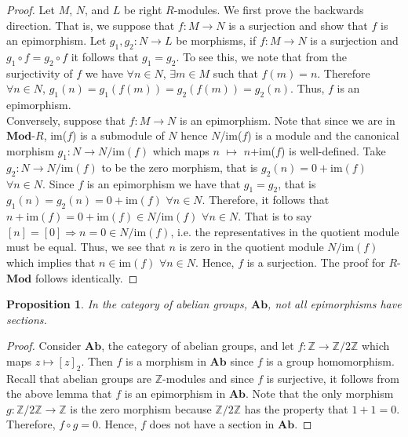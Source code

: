 \documentclass{article}
\newtheorem{proposition}[subsection]{Proposition}
\begin{document}
\begin{proof}
Let $M$, $N$, and $L$ be right $R$-modules. We first prove the backwards direction. That is, we suppose that $f:M\to N$ is a surjection and show that $f$ is an epimorphism. Let $g_{1},g_{2}:N\to L$ be morphisms, if $f:M\to N$ is a surjection and $g_{1}\circ f=g_{2}\circ f$ it follows that $g_{1}=g_{2}$. To see this, we note that from the surjectivity of $f$ we have $\forall n\in N$, $\exists m\in M$ such that $f(m)=n$. Therefore $\forall n\in N$, $g_{1}(n)=g_{1}(f(m))=g_{2}(f(m))=g_{2}(n)$. Thus, $f$ is an epimorphism.\\
Conversely, suppose that $f:M\to N$ is an epimorphism. Note that since we are in $\mathbf{Mod}$-$R$, im($f$) is a submodule of $N$ hence $N$/im($f$) is a module and the canonical morphism $g_{1}:N\to N/\text{im}(f)$ which maps $n$ $\mapsto$ $n$+im($f$) is well-defined. Take $g_{2}:N\to N/\text{im}(f)$ to be the zero morphism, that is $g_{2}(n)=0+\text{im}(f)$ $\forall n\in N$. Since $f$ is an epimorphism we have that $g_{1}=g_{2}$, that is $g_{1}(n)=g_{2}(n)=0+\text{im}(f)$ $\forall n\in N$. Therefore, it follows that $n+\text{im}(f)=0+\text{im}(f) \in N/\text{im}(f)$ $\forall n\in N$. That is to say $[n]=[0] \Longrightarrow n=0 \in N/\text{im}(f)$, i.e. the representatives in the quotient module must be equal. Thus, we see that $n$ is zero in the quotient module $N/\text{im}(f)$ which implies that $n\in \text{im}(f)$ $\forall n\in N$. Hence, $f$ is a surjection. The proof for $R$-$\mathbf{Mod}$ follows identically.
\end{proof}

\begin{proposition}
In the category of abelian groups, $\mathbf{Ab}$, not all epimorphisms have sections.
\end{proposition}

\begin{proof}
Consider $\mathbf{Ab}$, the category of abelian groups, and let $f:\mathbb{Z}\to \mathbb{Z}/2\mathbb{Z}$ which maps $z \mapsto [z]_{2}$. Then $f$ is a morphism in $\mathbf{Ab}$ since $f$ is a group homomorphism. Recall that abelian groups are $\mathbb{Z}$-modules and since $f$ is surjective, it follows from the above lemma that $f$ is an epimorphism in $\mathbf{Ab}$. Note that the only morphism $g:\mathbb{Z}/2\mathbb{Z}\to \mathbb{Z}$ is the zero morphism because $\mathbb{Z}/2\mathbb{Z}$ has the property that $1+1=0$. Therefore, $f\circ g=0$. Hence, $f$ does not have a section in $\mathbf{Ab}$.
\end{proof}
\end{document}
